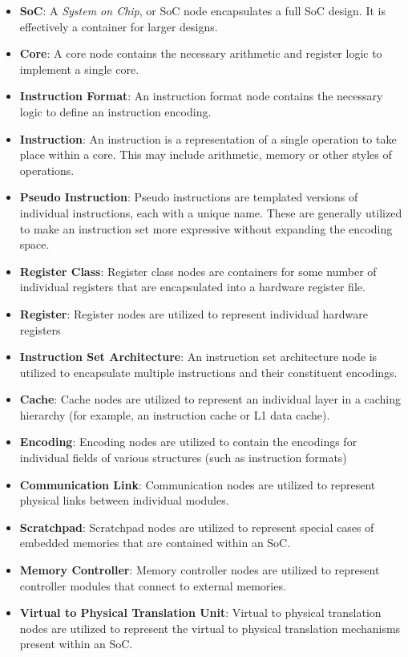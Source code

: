 \documentclass{article}
\begin{document}
\begin{itemize}
\item \textbf{SoC}: A \textit{System on Chip}, or SoC node encapsulates a full SoC design.  It is effectively a container for larger designs.
\item \textbf{Core}: A core node contains the necessary arithmetic and register logic to implement a single core.
\item \textbf{Instruction Format}: An instruction format node contains the necessary logic to define an instruction encoding.
\item \textbf{Instruction}: An instruction is a representation of a single operation to take place within a core.  This may include arithmetic, memory or other styles of operations.
\item \textbf{Pseudo Instruction}: Pseudo instructions are templated versions of individual instructions, each with a unique name.  These are generally utilized to make an instruction set more expressive without expanding the encoding space.
\item \textbf{Register Class}: Register class nodes are containers for some number of individual registers that are encapsulated into a hardware register file.
\item \textbf{Register}: Register nodes are utilized to represent individual hardware registers
\item \textbf{Instruction Set Architecture}: An instruction set architecture node is utilized to encapsulate multiple instructions and their constituent encodings.
\item \textbf{Cache}: Cache nodes are utilized to represent an individual layer in a caching hierarchy (for example, an instruction cache or L1 data cache).
\item \textbf{Encoding}: Encoding nodes are utilized to contain the encodings for individual fields of various structures (such as instruction formats)
\item \textbf{Communication Link}: Communication nodes are utilized to represent physical links between individual modules.  
\item \textbf{Scratchpad}: Scratchpad nodes are utilized to represent special cases of embedded memories that are contained within an SoC.  
\item \textbf{Memory Controller}: Memory controller nodes are utilized to represent controller modules that connect to external memories.
\item \textbf{Virtual to Physical Translation Unit}: Virtual to physical translation nodes are utilized to represent the virtual to physical translation mechanisms present within an SoC.

\end{itemize}
\end{document}
